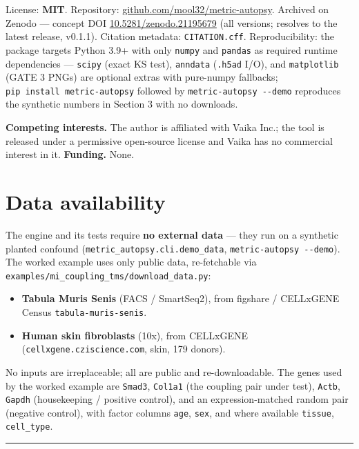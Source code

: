 \documentclass[
  11pt,
]{article}
\providecommand{\tightlist}{%
  \setlength{\itemsep}{0pt}\setlength{\parskip}{0pt}}
\begin{document}
License: \textbf{MIT}. Repository:
\href{https://github.com/mool32/metric-autopsy}{github.com/mool32/metric-autopsy}.
Archived on Zenodo --- concept DOI
\href{https://doi.org/10.5281/zenodo.21195679}{10.5281/zenodo.21195679}
(all versions; resolves to the latest release, v0.1.1). Citation
metadata: \texttt{CITATION.cff}. Reproducibility: the package targets
Python 3.9+ with only \texttt{numpy} and \texttt{pandas} as required
runtime dependencies --- \texttt{scipy} (exact KS test),
\texttt{anndata} (\texttt{.h5ad} I/O), and \texttt{matplotlib} (GATE 3
PNGs) are optional extras with pure-numpy fallbacks;
\texttt{pip\ install\ metric-autopsy} followed by
\texttt{metric-autopsy\ -\/-demo} reproduces the synthetic numbers in
Section 3 with no downloads.

\textbf{Competing interests.} The author is affiliated with Vaika Inc.;
the tool is released under a permissive open-source license and Vaika
has no commercial interest in it. \textbf{Funding.} None.

\section{Data availability}\label{data-availability}

The engine and its tests require \textbf{no external data} --- they run
on a synthetic planted confound
(\texttt{metric\_autopsy.cli.demo\_data},
\texttt{metric-autopsy\ -\/-demo}). The worked example uses only public
data, re-fetchable via
\texttt{examples/mi\_coupling\_tms/download\_data.py}:

\begin{itemize}
\tightlist
\item
  \textbf{Tabula Muris Senis} (FACS / SmartSeq2), from figshare /
  CELLxGENE Census \texttt{tabula-muris-senis}.
\item
  \textbf{Human skin fibroblasts} (10x), from CELLxGENE
  (\texttt{cellxgene.cziscience.com}, skin, 179 donors).
\end{itemize}

No inputs are irreplaceable; all are public and re-downloadable. The
genes used by the worked example are \texttt{Smad3}, \texttt{Col1a1}
(the coupling pair under test), \texttt{Actb}, \texttt{Gapdh}
(housekeeping / positive control), and an expression-matched random pair
(negative control), with factor columns \texttt{age}, \texttt{sex}, and
where available \texttt{tissue}, \texttt{cell\_type}.

\begin{center}\rule{0.5\linewidth}{0.5pt}\end{center}
\end{document}
